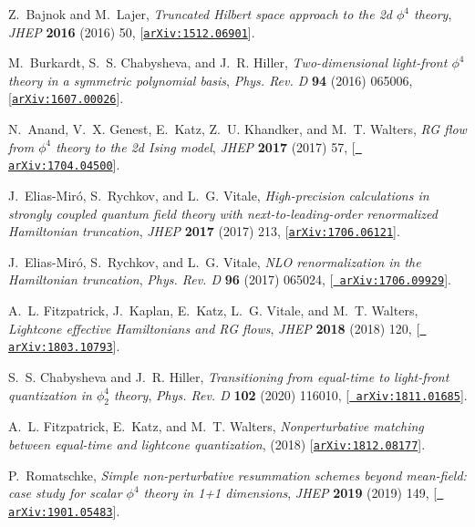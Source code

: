\documentclass[a4paper,11pt]{article}
\begin{document}
\begin{thebibliography}{10}
Z.~Bajnok and M.~Lajer, {\it Truncated \textrm{H}ilbert space approach to the
  2d $\phi^4$ theory},  {\em JHEP} {\bf 2016} (2016) 50,
  [\href{http://arxiv.org/abs/1512.06901}{{\tt arXiv:1512.06901}}].

M.~Burkardt, S.~S. Chabysheva, and J.~R. Hiller, {\it Two-dimensional
  light-front ${\ensuremath{\phi}}^{4}$ theory in a symmetric polynomial
  basis},  {\em Phys. Rev. D} {\bf 94} (2016) 065006,
  [\href{http://arxiv.org/abs/1607.00026}{{\tt arXiv:1607.00026}}].

N.~Anand, V.~X. Genest, E.~Katz, Z.~U. Khandker, and M.~T. Walters, {\it
  \textrm{RG} flow from $\phi^4$ theory to the 2d \textrm{I}sing model},  {\em
  JHEP} {\bf 2017} (2017) 57, [\href{http://arxiv.org/abs/1704.04500}{{\tt
  arXiv:1704.04500}}].

J.~Elias-Mir\'o, S.~Rychkov, and L.~G. Vitale, {\it High-precision calculations
  in strongly coupled quantum field theory with next-to-leading-order
  renormalized Hamiltonian truncation},  {\em JHEP} {\bf 2017} (2017) 213,
  [\href{http://arxiv.org/abs/1706.06121}{{\tt arXiv:1706.06121}}].

J.~Elias-Mir\'o, S.~Rychkov, and L.~G. Vitale, {\it \textrm{NLO}
  renormalization in the Hamiltonian truncation},  {\em Phys. Rev. D} {\bf 96}
  (2017) 065024, [\href{http://arxiv.org/abs/1706.09929}{{\tt
  arXiv:1706.09929}}].

A.~L. Fitzpatrick, J.~Kaplan, E.~Katz, L.~G. Vitale, and M.~T. Walters, {\it
  Lightcone effective Hamiltonians and \textrm{RG} flows},  {\em JHEP} {\bf
  2018} (2018) 120, [\href{http://arxiv.org/abs/1803.10793}{{\tt
  arXiv:1803.10793}}].

S.~S. Chabysheva and J.~R. Hiller, {\it Transitioning from equal-time to
  light-front quantization in $\phi^4_2$ theory},  {\em Phys. Rev. D} {\bf 102}
  (2020) 116010, [\href{http://arxiv.org/abs/1811.01685}{{\tt
  arXiv:1811.01685}}].

A.~L. Fitzpatrick, E.~Katz, and M.~T. Walters, {\it Nonperturbative matching
  between equal-time and lightcone quantization},  {\em \mbox{}} (2018)
  [\href{http://arxiv.org/abs/1812.08177}{{\tt arXiv:1812.08177}}].

P.~Romatschke, {\it Simple non-perturbative resummation schemes beyond
  mean-field: case study for scalar $\phi^4$ theory in 1+1 dimensions},  {\em
  JHEP} {\bf 2019} (2019) 149, [\href{http://arxiv.org/abs/1901.05483}{{\tt
  arXiv:1901.05483}}].


\end{thebibliography}
\end{document}
